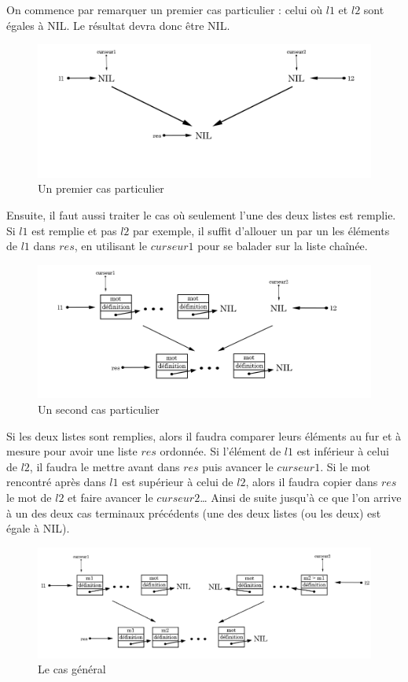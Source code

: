 \documentclass[a4paper, titlepage]{livret} %
\begin{document}
				On commence par remarquer un premier cas particulier : celui où $l1$ et $l2$ sont égales à NIL.
				Le résultat devra donc être NIL.	
				\begin{figure}[!ht]
				\centering
  					\includegraphics[scale=0.39]{fusionner1.png}
  					\caption{Un premier cas particulier} 
				\end{figure}

				Ensuite, il faut aussi traiter le cas où seulement l'une des deux listes est remplie.
				Si $l1$ est remplie et pas $l2$ par exemple, il suffit d'allouer un par un les éléments de $l1$ dans $res$, en utilisant le $curseur1$ pour se balader sur la liste chaînée.
				\begin{figure}[!ht]
				\centering
  					\includegraphics[scale=0.39]{fusionner2.png}
  					\caption{Un second cas particulier} 
				\end{figure}

				Si les deux listes sont remplies, alors il faudra comparer leurs éléments au fur et à mesure pour avoir une liste $res$ ordonnée.
				Si l'élément de $l1$ est inférieur à celui de $l2$, il faudra le mettre avant dans $res$ puis avancer le $curseur1$.
				Si le mot rencontré après dans $l1$ est supérieur à celui de $l2$, alors il faudra copier dans $res$ le mot de $l2$ et faire avancer le $curseur2$…
				Ainsi de suite jusqu'à ce que l'on arrive à un des deux cas terminaux précédents (une des deux listes (ou les deux) est égale à NIL).
				\begin{figure}[!ht]
				\centering
  					\includegraphics[scale=0.39]{fusionner3.png}
  					\caption{Le cas général} 
				\end{figure}
\end{document}
